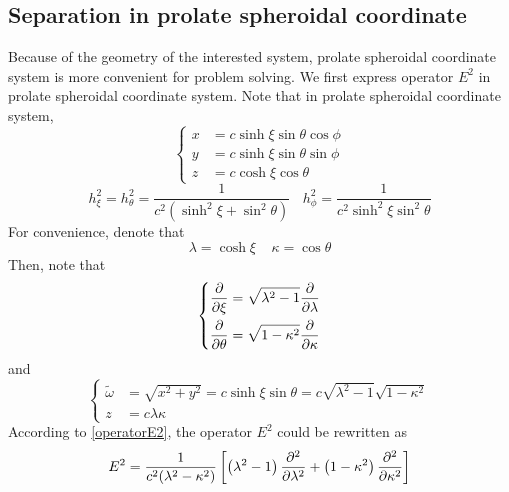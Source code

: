 \documentclass[fontsize=11pt, %
                             paper=a4, %
                             twoside, %
                             captions=tableheading,
                             index=totoc,
                             hyperref]{labbook}
\begin{document}
\begin{addmargin}[4cm]{0cm}
\section{Separation in prolate spheroidal coordinate}
Because of the geometry of the interested system, prolate spheroidal coordinate system is more convenient for problem solving. We first express operator $E^2$ in prolate spheroidal coordinate system. Note that in prolate spheroidal coordinate system,
\begin{equation}
\left\{
\begin{aligned}
x&=c\sinh\xi\sin\theta\cos\phi\\
y&=c\sinh\xi\sin\theta\sin\phi\\
z&=c\cosh\xi\cos\theta
\end{aligned}
\right.
\end{equation}
\begin{equation}
h_\xi^2=h_\theta^2=\frac{1}{c^2\left(\sinh^2\xi+\sin^2\theta\right)} \ \ \ \ h_\phi^2=\frac{1}{c^2\sinh^2\xi\sin^2\theta}
\end{equation}
For convenience, denote that
\begin{equation}
\lambda =\cosh \xi \ \ \ \ \ \kappa=\cos\theta
\end{equation}
Then, note that
\begin{equation}\label{eqn_differential}
\left\{
\begin{aligned}
\frac{\partial }{\partial \xi}&=\sqrt{\lambda^2-1}\frac{\partial }{\partial \lambda}\\
\frac{\partial }{\partial \theta}&=\sqrt{1-\kappa^2}\frac{\partial }{\partial \kappa}\\
\end{aligned}
\right.
\end{equation}
and
\begin{equation}
\left\{
\begin{aligned}
\tilde{\omega}&=\sqrt{x^2+y^2}=c\sinh\xi\sin\theta=c\sqrt{\lambda^2-1}\sqrt{1-\kappa^2}\\
z&=c\lambda\kappa
\end{aligned}
\right.
\end{equation}
According to \ref{operatorE2}, the operator $E^2$ could be rewritten as
\begin{equation}
E^2=\frac{1}{c^2(\lambda^2-\kappa^2)}\left[\left(\lambda^2-1\right)\frac{\partial^2 }{\partial \lambda^2}+\left(1-\kappa^2\right)\frac{\partial^2 }{\partial \kappa^2}\right]
\end{equation}

\end{addmargin}
\end{document}

